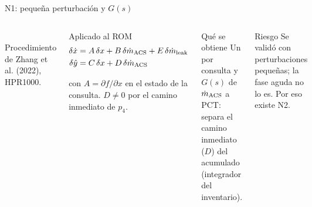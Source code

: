 \documentclass[aspectratio=169,10pt]{beamer}
\newcommand{\key}[1]{\leavevmode{\color{USMBlue}\bfseries #1}}
\newcommand{\yhat}{\hat y}
\newcommand{\md}{\dot m}
\begin{document}
\begin{frame}{N1: pequeña perturbación y $G(s)$}
\begin{columns}[T]
\centering
{}\\[.1cm]
\scriptsize Procedimiento de Zhang et al. (2022), HPR1000.
\begin{block}{Aplicado al ROM}
\small
\vspace{-.35cm}
\begin{align*}
\delta\dot x&=A\,\delta x+B\,\delta\md_{\rm ACS}+E\,\delta\md_{\rm leak}\\
\delta\yhat&=C\,\delta x+D\,\delta\md_{\rm ACS}
\end{align*}
\vspace{-.5cm}

con $A=\partial f/\partial x$ en el estado de la consulta. $D\neq0$ por el camino inmediato de $p_4$.
\end{block}
\begin{exampleblock}{Qué se obtiene}
\small Un \key{QP} por consulta y $G(s)$ de $\md_{\rm ACS}$ a PCT: separa el camino inmediato ($D$) del acumulado (integrador del inventario).
\end{exampleblock}
\begin{alertblock}{Riesgo}
\small Se validó con perturbaciones pequeñas; la fase aguda no lo es. Por eso existe N2.
\end{alertblock}
\end{columns}
\end{frame}
\end{document}
